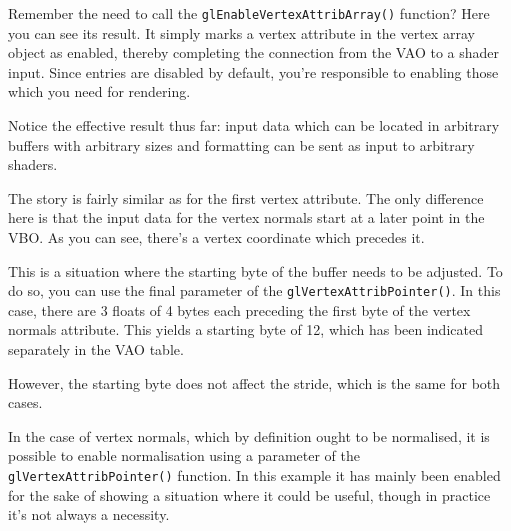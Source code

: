 Remember the need to call the \texttt{glEnableVertexAttribArray()} function? Here you can see its result. It simply marks a vertex attribute in the vertex array object as enabled, thereby completing the connection from the VAO to a shader input. Since entries are disabled by default, you're responsible to enabling those which you need for rendering.

Notice the effective result thus far: input data which can be located in arbitrary buffers with arbitrary sizes and formatting can be sent as input to arbitrary shaders. 

\newpage


The story is fairly similar as for the first vertex attribute. The only difference here is that the input data for the vertex normals start at a later point in the VBO. As you can see, there's a vertex coordinate which precedes it. 

This is a situation where the starting byte of the buffer needs to be adjusted. To do so, you can use the final parameter of the \texttt{glVertexAttribPointer()}. In this case, there are 3 floats of 4 bytes each preceding the first byte of the vertex normals attribute. This yields a starting byte of 12, which has been indicated separately in the VAO table.

However, the starting byte does not affect the stride, which is the same for both cases.

In the case of vertex normals, which by definition ought to be normalised, it is possible to enable normalisation using a parameter of the \texttt{glVertexAttribPointer()} function. In this example it has mainly been enabled for the sake of showing a situation where it could be useful, though in practice it's not always a necessity.

